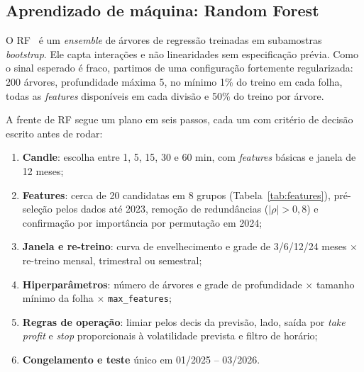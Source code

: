 \documentclass[conference]{IEEEtran}
\begin{document}
\subsection{Aprendizado de máquina: Random Forest}

O RF~\cite{breiman2001} é um \emph{ensemble} de árvores de regressão treinadas em subamostras \emph{bootstrap}. Ele capta interações e não linearidades sem especificação prévia. Como o sinal esperado é fraco, partimos de uma configuração fortemente regularizada: 200 árvores, profundidade máxima 5, no mínimo 1\% do treino em cada folha, todas as \emph{features} disponíveis em cada divisão e 50\% do treino por árvore.

A frente de RF segue um plano em seis passos, cada um com critério de decisão escrito antes de rodar:
\begin{enumerate}
  \item \textbf{Candle}: escolha entre 1, 5, 15, 30 e 60 min, com \emph{features} básicas e janela de 12 meses;
  \item \textbf{Features}: cerca de 20 candidatas em 8 grupos (Tabela~\ref{tab:features}), pré-seleção pelos dados até 2023, remoção de redundâncias ($|\rho|>0{,}8$) e confirmação por importância por permutação em 2024;
  \item \textbf{Janela e re-treino}: curva de envelhecimento e grade de 3/6/12/24 meses $\times$ re-treino mensal, trimestral ou semestral;
  \item \textbf{Hiperparâmetros}: número de árvores e grade de profundidade $\times$ tamanho mínimo da folha $\times$ \texttt{max\_features};
  \item \textbf{Regras de operação}: limiar pelos decis da previsão, lado, saída por \emph{take profit} e \emph{stop} proporcionais à volatilidade prevista e filtro de horário;
  \item \textbf{Congelamento e teste} único em 01/2025 -- 03/2026.
\end{enumerate}
\end{document}
